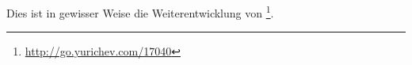 \newcommand{\URLREGPARMM}{\url{http://go.yurichev.com/17040}}

Dies ist in gewisser Weise die Weiterentwicklung von \footnote{\URLREGPARMM}.
%
%
%
%
%
%
%
%
%
%
%
%
%
%
%
